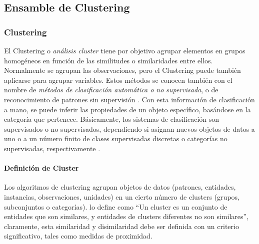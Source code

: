 \subsection{Ensamble de Clustering}
\subsubsection{Clustering}
El Clustering o \textit{análisis cluster} tiene por objetivo agrupar elementos en grupos homogéneos en función de las similitudes o similaridades entre ellos. Normalmente se agrupan las observaciones, pero el Clustering puede también aplicarse para agrupar variables. Estos métodos se conocen también con el nombre de \textit{métodos de clasificación automática o no supervisada}, o de reconocimiento de patrones sin supervisión \citep{pena2013analisis}. Con esta información de clasificación a mano, se puede inferir las propiedades de un objeto específico, basándose en la categoría que pertenece. Básicamente, los sistemas de clasificación son supervisados o no supervisados, dependiendo si asignan nuevos objetos de datos a uno o a un número finito de clases supervisadas discretas o categorías no supervisadas, respectivamente \citep{xu2008clustering}.

\paragraph{Definición de Cluster}
Los algoritmos de clustering agrupan objetos de datos (patrones, entidades, instancias, observaciones, unidades) en un cierto número de clusters (grupos, subconjuntos o categorías).
\cite{everittcluster} lo define como “Un cluster es un conjunto de entidades que son similares, y entidades de clusters diferentes no son similares”, claramente, esta similaridad y disimilaridad debe ser definida con un criterio significativo, tales como medidas de proximidad.

